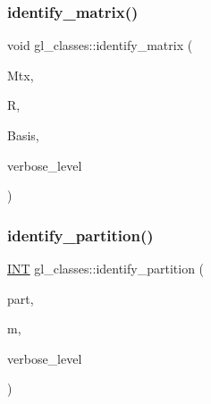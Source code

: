 \mbox{\label{classgl__classes_af529d1d8ff5a52703c5ac1d70806092e}} 
\subsubsection{\texorpdfstring{identify\+\_\+matrix()}{identify\_matrix()}}
{\footnotesize\ttfamily void gl\+\_\+classes\+::identify\+\_\+matrix (\begin{DoxyParamCaption}\item[{\mbox{\hyperlink{galois_8h_a09fddde158a3a20bd2dcadb609de11dc}{I\+NT}} $\ast$}]{Mtx,  }\item[{\mbox{\hyperlink{classgl__class__rep}{gl\+\_\+class\+\_\+rep}} $\ast$}]{R,  }\item[{\mbox{\hyperlink{galois_8h_a09fddde158a3a20bd2dcadb609de11dc}{I\+NT}} $\ast$}]{Basis,  }\item[{\mbox{\hyperlink{galois_8h_a09fddde158a3a20bd2dcadb609de11dc}{I\+NT}}}]{verbose\+\_\+level }\end{DoxyParamCaption})}

\mbox{\label{classgl__classes_ae1a3529a18e89a23c1ba94fca597e025}} 
\subsubsection{\texorpdfstring{identify\+\_\+partition()}{identify\_partition()}}
{\footnotesize\ttfamily \mbox{\hyperlink{galois_8h_a09fddde158a3a20bd2dcadb609de11dc}{I\+NT}} gl\+\_\+classes\+::identify\+\_\+partition (\begin{DoxyParamCaption}\item[{\mbox{\hyperlink{galois_8h_a09fddde158a3a20bd2dcadb609de11dc}{I\+NT}} $\ast$}]{part,  }\item[{\mbox{\hyperlink{galois_8h_a09fddde158a3a20bd2dcadb609de11dc}{I\+NT}}}]{m,  }\item[{\mbox{\hyperlink{galois_8h_a09fddde158a3a20bd2dcadb609de11dc}{I\+NT}}}]{verbose\+\_\+level }\end{DoxyParamCaption})}

\mbox{\label{classgl__classes_a48ec2319989d4fc7b36d736aef4f6452}} 
